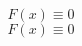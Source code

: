 \documentclass[nofonts]{ctexart}
\begin{document}
{\Large \[ F(x) \equiv 0 \]}
\[
	F(x) \equiv 0
\]
\end{document}
